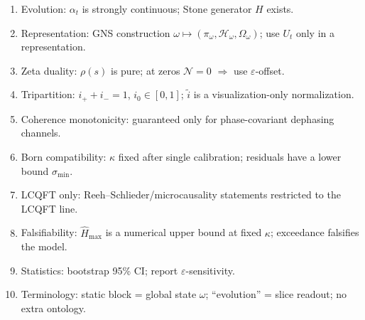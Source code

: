 \documentclass[11pt]{article}
\theoremstyle{definition}
\theoremstyle{remark}
\begin{document}
\begin{enumerate}
\item Evolution: \( \alpha_t \) is strongly continuous; Stone generator \( H \) exists.
\item Representation: GNS construction \( \omega\mapsto (\pi_\omega,\mathcal{H}_\omega,\Omega_\omega) \); use \( U_t \) only in a representation.
\item Zeta duality: \( \rho(s) \) is pure; at zeros \( \mathcal{N}=0 \) \( \Rightarrow \) use \( \varepsilon \)-offset.
\item Tripartition: \( i_+ + i_- = 1 \), \( i_0\in[0,1] \); \( \tilde i \) is a visualization-only normalization.
\item Coherence monotonicity: guaranteed only for phase-covariant dephasing channels.
\item Born compatibility: \( \kappa \) fixed after single calibration; residuals have a lower bound \( \sigma_{\min} \).
\item LCQFT only: Reeh--Schlieder/microcausality statements restricted to the LCQFT line.
\item Falsifiability: \( \hat H_{\max} \) is a numerical upper bound at fixed \( \kappa \); exceedance falsifies the model.
\item Statistics: bootstrap 95\% CI; report \( \varepsilon \)-sensitivity.
\item Terminology: static block = global state \( \omega \); ``evolution'' = slice readout; no extra ontology.
\end{enumerate}
\end{document}
